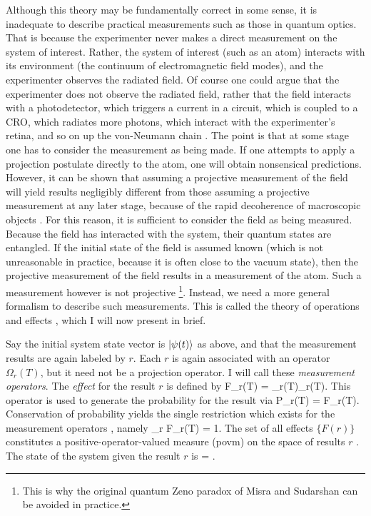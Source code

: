 \documentclass[12pt]{article}
\begin{document}
Although this theory may be fundamentally correct in some sense, it is inadequate
to describe practical measurements such as those in quantum optics. That is
because the experimenter never makes a direct measurement on the system of
interest. Rather, the system of interest (such as an atom) interacts with its
environment (the continuum of electromagnetic field modes), and the experimenter
observes the radiated field. Of course one could argue that the
experimenter does not observe the radiated field, rather that the field interacts
with a photodetector, which triggers a current in a circuit, which is coupled to a
CRO, which radiates more photons, which interact with the experimenter's
retina, and so on up the von-Neumann chain \cite{Von32}. The point is that at some
stage one has to consider the measurement as being made. If one attempts to apply a
projection postulate directly to the atom, one will obtain nonsensical predictions.
However, it can be shown that assuming a projective measurement of the field will
yield results negligibly different from those assuming a projective measurement at
any later stage, because of the rapid decoherence of macroscopic
objects \cite{Zur82}. For this reason, it  is sufficient to consider the field as
being measured. Because the field has interacted with the system, their quantum
states are entangled. If the initial state of the field is assumed known (which is
not unreasonable in practice, because it is often close to the vacuum state), then
the projective measurement of the field results in a measurement of the atom. Such
a measurement however is not projective \footnote{This is why the original quantum
Zeno paradox of Misra and Sudarshan \cite{MisSud77} can be avoided in practice.}.
Instead, we need a more general formalism to describe such measurements. This is
called the theory of operations and effects  \cite{Dav76}, which I will now present
in brief.

Say the initial system state vector is $| {\psi(t)} \rangle$ as above, and that the
measurement results are again labeled by $r$. Each $r$ is again associated with an
operator $\Omega_r(T)$, but it need not be a projection operator. I will call these
{\em measurement operators}.  The {\em effect} \cite{Dav76} for the result $r$ is
defined by  \beq
F_r(T) = \Omega_r(T)\dg \Omega_r(T). \label{hereisfac}
\eeq
This operator is used to generate the probability for the result via
\beq
P_r(T) = F_r(T). \label{onea}
\eeq
Conservation of probability yields the single restriction which exists for the
measurement operators \cite{Dav76}, namely
\beq \label{coef}
\sum_r F_r(T) = 1.
\eeq
The set of all effects $\{ F(r) \}$ constitutes a positive-operator-valued
measure ({\sc povm}) on the space of results $r$ \cite{Dav76}. The state of the system
given the result $r$ is \beq
{} = .
\label{oneb} \eeq
\end{document}
